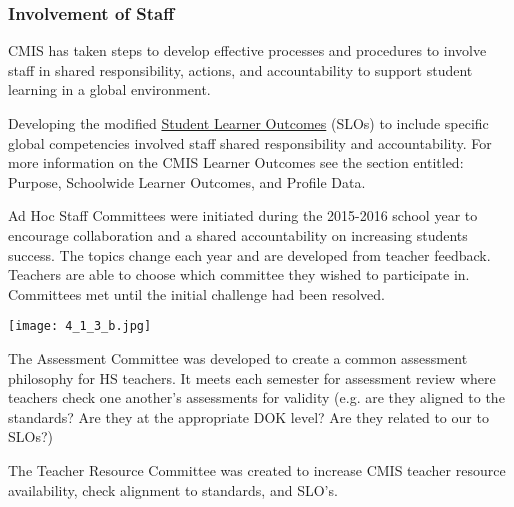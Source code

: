 \subsubsection{Involvement of Staff}



\begin{findings}
CMIS has taken steps to develop effective processes and procedures to involve staff in shared responsibility, actions, and accountability to support student learning in a global environment.


Developing the modified \href{https://docs.google.com/document/d/1bIbV9pgGz2vpXYJdnRzL_Od5PS35egy7lgBOBuszgD4/edit}{Student Learner Outcomes} (SLOs) to include specific global competencies involved staff shared responsibility and accountability.  For more information on the CMIS Learner Outcomes see the section entitled: Purpose, Schoolwide Learner Outcomes, and Profile Data.


Ad Hoc Staff Committees were initiated during the 2015-2016 school year to encourage collaboration and a shared accountability on increasing students success. The topics change each year and are developed from teacher feedback. Teachers are able to choose which committee they wished to participate in. Committees met until the initial challenge had been resolved. 

{\centering\texttt{[image: 4\_1\_3\_b.jpg]}}

The Assessment Committee was developed to create a common assessment philosophy for HS teachers. It meets each semester for assessment review where teachers check one another’s assessments for validity (e.g. are they aligned to the standards? Are they at the appropriate DOK level? Are they related to our to SLOs?) 

The Teacher Resource Committee was created to increase CMIS teacher resource availability, check alignment to standards, and SLO’s. 


\end{findings}

